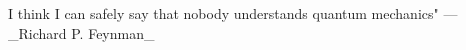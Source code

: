\documentclass[preview]{standalone}
\begin{document}
\begin{center}
I think I can safely say that nobody understands quantum mechanics" — _Richard P. Feynman_{\quad}
\end{center}
\end{document}
